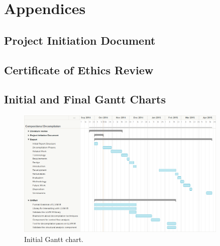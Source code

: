 
\appendix
\setcounter{secnumdepth}{0}
\section{Appendices}
\setcounter{secnumdepth}{3}
\renewcommand{\thesubsection}{\Alph{subsection}}


\subsection{Project Initiation Document}




\subsection{Certificate of Ethics Review}




\subsection{Initial and Final Gantt Charts}

\begin{figure}[htbp]
	\begin{center}
		\includegraphics[angle=270, width=0.9\textwidth]{appendices/gantt_initial.png}
		\caption{Initial Gantt chart.}
	\end{center}
\end{figure}

